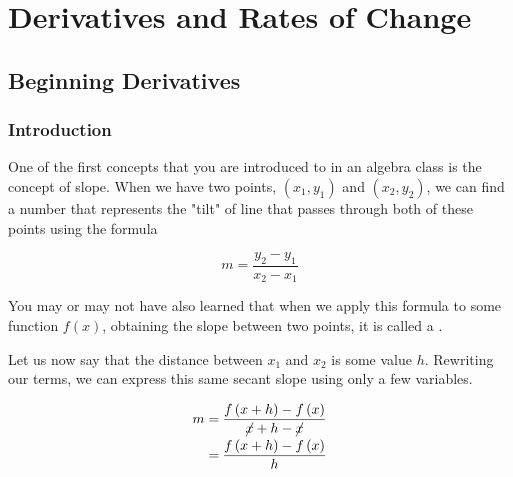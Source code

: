 \chapter{Derivatives and Rates of Change}

\section{Beginning Derivatives}

\subsection{Introduction}

One of the first concepts that you are introduced to in an algebra class is the concept of slope. When we have two points, \( \left( x_1, y_1 \right) \) and \( \left( x_2, y_2 \right) \), we can find a number that represents the "tilt" of line that passes through both of these points using the formula

\[ m = \dfrac{y_2 - y_1}{x_2 - x_1} \]

You may or may not have also learned that when we apply this formula to some function \( f \left( x \right) \), obtaining the slope between two points, it is called a .

\begin{center}
\end{center}

Let us now say that the distance between \( x_1 \) and \( x_2 \) is some value \( h \). Rewriting our terms, we can express this same secant slope using only a few variables.

\begin{align}
    m = \> &\dfrac{f \left( x + h \right) - f \left( x \right)}{\cancel{x} + h - \cancel{x}} \\
    = \> &\dfrac{f \left( x + h \right) - f \left( x \right)}{h}
\end{align}

